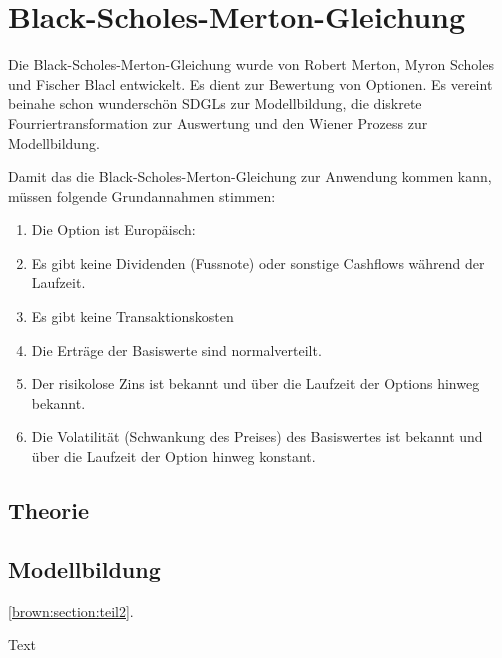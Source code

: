 %
%
%
%
\section{Black-Scholes-Merton-Gleichung\label{brown:BlackScholes}}

Die Black-Scholes-Merton-Gleichung wurde von Robert Merton, Myron Scholes und Fischer Blacl entwickelt. Es dient zur Bewertung von Optionen. Es vereint beinahe schon wunderschön SDGLs zur Modellbildung, die diskrete Fourriertransformation zur Auswertung und den Wiener Prozess zur Modellbildung.

Damit das die Black-Scholes-Merton-Gleichung zur Anwendung kommen kann, müssen folgende Grundannahmen stimmen:
\begin{enumerate}
	\item Die Option ist Europäisch: 
	\item Es gibt keine Dividenden (Fussnote) oder sonstige Cashflows während der Laufzeit.
	\item Es gibt keine Transaktionskosten
	\item Die Erträge der Basiswerte sind normalverteilt.
	\item Der risikolose Zins ist bekannt und über die Laufzeit der Options hinweg bekannt.
	\item Die Volatilität (Schwankung des Preises) des Basiswertes ist bekannt und über die Laufzeit der Option hinweg konstant.
\end{enumerate}


\subsection{Theorie\label{brown:BlackScholes:theorie}}



\subsection{Modellbildung\label{rown:BlackScholes:modell}}
\ref{brown:section:teil2}.

Text
